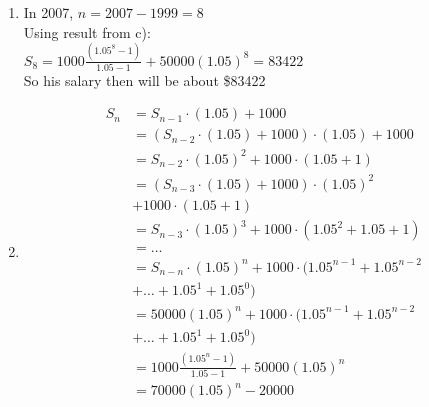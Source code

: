 \documentclass[12pt]{article}
\begin{document}
\begin{multicols}{2}
\begin{enumerate}[label=\alph*)]
          \item %
            In 2007,
           \(n=2007-1999=8\) \\
            Using result from c):\\
            \(S_8=1000\frac{(1.05^8-1)}{1.05-1}+50000(1.05)^8=83422\)\\
            So his salary then will be about \$83422 

          \item %
            \begin{align*}
            S_n&=S_{n-1}\cdot(1.05) + 1000 \\
            &=(S_{n-2}\cdot(1.05) + 1000)\cdot(1.05) + 1000 \\
            &=S_{n-2}\cdot(1.05)^2+1000\cdot(1.05+1) \\
            &=(S_{n-3}\cdot(1.05)+1000)\cdot(1.05)^2 \\
            & + 1000\cdot(1.05+1) \\
            &=S_{n-3}\cdot(1.05)^3+1000\cdot(1.05^2+1.05+1) \\
            &=\dots \\
            &=S_{n-n}\cdot(1.05)^n+1000\cdot(1.05^{n-1}+1.05^{n-2} \\
            &+\dots+1.05^1+1.05^0) \\
            &=50000(1.05)^n+1000\cdot(1.05^{n-1}+1.05^{n-2} \\
            &+\dots+1.05^1+1.05^0) \\
            &=1000\frac{(1.05^n-1)}{1.05-1}+50000(1.05)^n\\
            &=70000(1.05)^n - 20000
            \end{align*}           
        \end{enumerate}
  \end{multicols}
\end{document}

